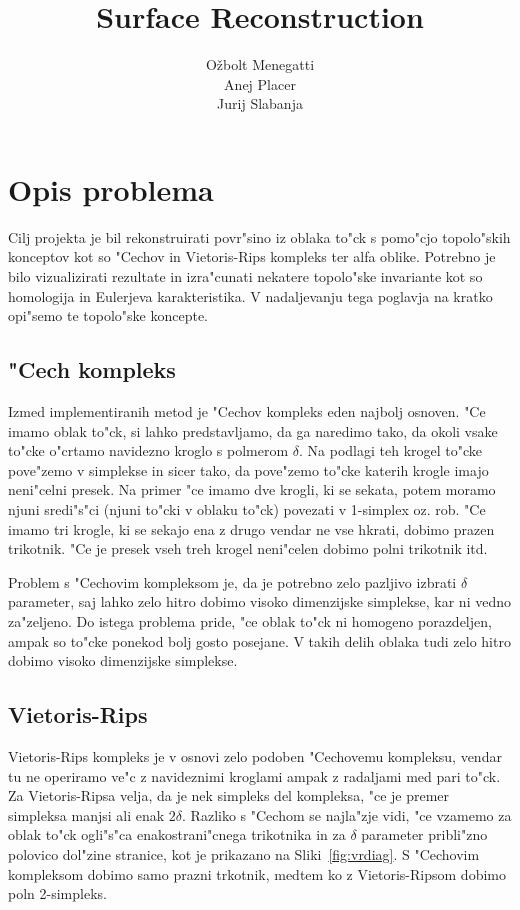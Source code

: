 \documentclass[11pt]{article}
\title{\textbf{Surface Reconstruction}}
\author{O\v zbolt Menegatti\\
		Anej Placer\\
		Jurij Slabanja}
\date{}
\begin{document}
\maketitle

\section{Opis problema}

Cilj projekta je bil rekonstruirati povr"sino iz oblaka to"ck s pomo"cjo topolo"skih konceptov kot so "Cechov in Vietoris-Rips kompleks ter alfa oblike. Potrebno je bilo vizualizirati rezultate in izra"cunati nekatere topolo"ske invariante kot so homologija in Eulerjeva karakteristika. V nadaljevanju tega poglavja na kratko opi"semo te topolo"ske koncepte.

\subsection{"Cech kompleks}
Izmed implementiranih metod je "Cechov kompleks eden najbolj osnoven. "Ce imamo oblak to"ck, si lahko predstavljamo, da ga naredimo tako, da okoli vsake to"cke o"crtamo navidezno kroglo s polmerom $\delta$. Na podlagi teh krogel to"cke pove"zemo v simplekse in sicer tako, da pove"zemo to"cke katerih krogle imajo neni"celni presek. Na primer "ce imamo dve krogli, ki se sekata, potem moramo njuni sredi"s"ci (njuni to"cki v oblaku to"ck) povezati v 1-simplex oz. rob. "Ce imamo tri krogle, ki se sekajo ena z drugo vendar ne vse hkrati, dobimo prazen trikotnik. "Ce je presek vseh treh krogel neni"celen dobimo polni trikotnik itd.\cite{Kerber2013} 

Problem s "Cechovim kompleksom je, da je potrebno zelo pazljivo izbrati $\delta$ parameter, saj lahko zelo hitro dobimo visoko dimenzijske simplekse, kar ni vedno za"zeljeno. Do istega problema pride, "ce oblak to"ck ni homogeno porazdeljen, ampak so to"cke ponekod bolj gosto posejane. V takih delih oblaka tudi zelo hitro dobimo visoko dimenzijske simplekse.

\subsection{Vietoris-Rips}
Vietoris-Rips kompleks je v osnovi zelo podoben "Cechovemu kompleksu, vendar tu ne operiramo ve"c z navideznimi kroglami ampak z radaljami med pari to"ck. Za Vietoris-Ripsa velja, da je nek simpleks del kompleksa, "ce je premer simpleksa manjsi ali enak $2\delta$. Razliko s "Cechom se najla"zje vidi, "ce vzamemo za oblak to"ck ogli"s"ca enakostrani"cnega trikotnika in za $\delta$ parameter pribli"zno polovico dol"zine stranice, kot je prikazano na Sliki~\ref{fig:vrdiag}. S "Cechovim kompleksom dobimo samo prazni trkotnik, medtem ko z Vietoris-Ripsom dobimo poln 2-simpleks.\cite{Zomorodian2010263}
\end{document}
